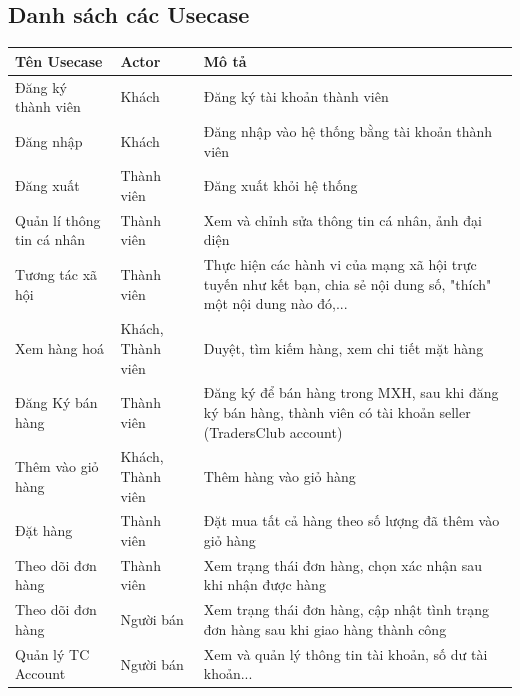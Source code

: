 \subsection{Danh sách các Usecase}
\begin{table}[H]
	\centering
	\begin{tabularx}{\textwidth}{|l|>{\raggedright\arraybackslash}X|>{\raggedright\arraybackslash}X |}
		\hline
		
		Tên Usecase &Actor &Mô tả\\
		\hline
		
		Đăng ký thành viên&Khách&Đăng ký tài khoản thành viên\\
		\hline	
		
		Đăng nhập&Khách&Đăng nhập vào hệ thống bằng tài khoản thành viên\\
		\hline
		
		Đăng xuất&Thành viên&Đăng xuất khỏi hệ thống\\
		\hline
		
		Quản lí thông tin cá nhân&Thành viên&Xem và chỉnh sửa thông tin cá nhân, ảnh đại diện\\
		\hline
		
		Tương tác xã hội&Thành viên&Thực hiện các hành vi của mạng xã hội trực tuyến như kết bạn, chia sẻ nội dung số, "thích" một nội dung nào đó,...\\
		\hline
		
		Xem hàng hoá&Khách, Thành viên&Duyệt, tìm kiếm hàng, xem chi tiết mặt hàng\\
		\hline
		
		 Đăng Ký bán hàng&Thành viên&Đăng ký để bán hàng trong MXH, sau khi đăng ký bán hàng, thành viên có tài khoản seller (TradersClub account)\\
		 \hline
		 
		 Thêm vào giỏ hàng&Khách, Thành viên&Thêm hàng vào giỏ hàng\\
		 \hline
		 
		 Đặt hàng&Thành viên&Đặt mua tất cả hàng theo số lượng đã thêm vào giỏ hàng\\
		 \hline
		 
		 Theo dõi đơn hàng&Thành viên&Xem trạng thái đơn hàng, chọn xác nhận sau khi nhận được hàng\\
		 \hline
		 
		 Theo dõi đơn hàng&Người bán&Xem trạng thái đơn hàng, cập nhật tình trạng đơn hàng sau khi giao hàng thành công\\
		 \hline
		 
		 Quản lý TC Account&Người bán&Xem và quản lý thông tin tài khoản, số dư tài khoản...\\
		 \hline
		 

\end{tabularx}
\end{table}
